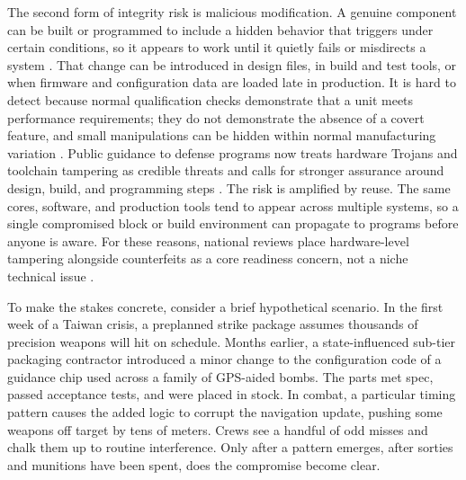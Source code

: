 The second form of integrity risk is malicious modification. A genuine component can be built or programmed to include a hidden behavior that triggers under certain conditions, so it appears to work until it quietly fails or misdirects a system \parencite{kahn_semiconductors_2023}. That change can be introduced in design files, in build and test tools, or when firmware and configuration data are loaded late in production. It is hard to detect because normal qualification checks demonstrate that a unit meets performance requirements; they do not demonstrate the absence of a covert feature, and small manipulations can be hidden within normal manufacturing variation \parencite{semiconductor_equipment_and_materials_international_heterogeneous_2021}. Public guidance to defense programs now treats hardware Trojans and toolchain tampering as credible threats and calls for stronger assurance around design, build, and programming steps \parencite{kahn_semiconductors_2023,tehranipoor_hardware_trojan_2010}. The risk is amplified by reuse. The same cores, software, and production tools tend to appear across multiple systems, so a single compromised block or build environment can propagate to programs before anyone is aware. For these reasons, national reviews place hardware-level tampering alongside counterfeits as a core readiness concern, not a niche technical issue \parencite{TheWhiteHouse2021}.

To make the stakes concrete, consider a brief hypothetical scenario. In the first week of a Taiwan crisis, a preplanned strike package assumes thousands of precision weapons will hit on schedule. Months earlier, a state-influenced sub-tier packaging contractor introduced a minor change to the configuration code of a guidance chip used across a family of GPS-aided bombs. The parts met spec, passed acceptance tests, and were placed in stock. In combat, a particular timing pattern causes the added logic to corrupt the navigation update, pushing some weapons off target by tens of meters. Crews see a handful of odd misses and chalk them up to routine interference. Only after a pattern emerges, after sorties and munitions have been spent, does the compromise become clear.

